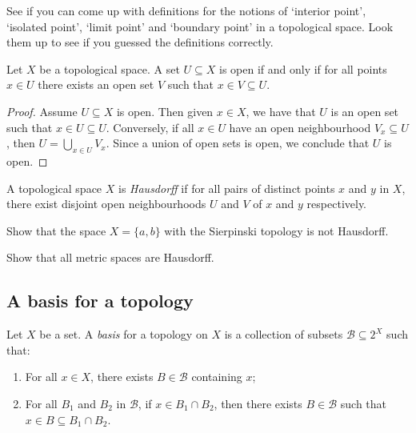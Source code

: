 \documentclass[a4paper,11pt]{article}
\begin{document}
    \begin{exercise}
      See if you can come up with definitions for the notions of `interior point', `isolated point', `limit point' and `boundary point' in a topological space. Look them up to see if you guessed the definitions correctly.
    \end{exercise}

    \begin{proposition}
      Let \(X\) be a topological space. A set \(U \subseteq X\) is open if and only if for all points \(x \in U\) there exists an open set \(V\) such that \(x \in V \subseteq U\).
    \end{proposition}
    \begin{proof}
      Assume \(U \subseteq X\) is open. Then given \(x \in X\), we have that \(U\) is an open set such that \(x \in U \subseteq U\). Conversely, if all \(x \in U\) have an open neighbourhood \(V_x \subseteq U\), then \(U = \bigcup_{x \in U} V_x\). Since a union of open sets is open, we conclude that \(U\) is open.
    \end{proof}

    \begin{definition}
      A topological space \(X\) is \emph{Hausdorff} if for all pairs of distinct points \(x\) and \(y\) in \(X\), there exist disjoint open neighbourhoods \(U\) and \(V\) of \(x\) and \(y\) respectively.
    \end{definition}

    \begin{exercise}
      Show that the space \(X = \{a,b\}\) with the Sierpinski topology is not Hausdorff.
    \end{exercise}

    \begin{exercise}
      Show that all metric spaces are Hausdorff.
    \end{exercise}

    \subsection{A basis for a topology}
    \begin{definition}
      Let \(X\) be a set. A \emph{basis} for a topology on \(X\) is a collection of subsets \(\mathcal{B} \subseteq 2^X\) such that:
      \begin{enumerate}[label=(\roman*)]
        \item For all \(x \in X\), there exists \(B \in \mathcal{B}\) containing \(x\);
        \item For all \(B_1\) and \(B_2\) in \(\mathcal{B}\), if \(x \in B_1 \cap B_2\), then there exists \(B \in \mathcal{B}\) such that \(x \in B \subseteq B_1 \cap B_2\).
      \end{enumerate}
    \end{definition}
\end{document}
